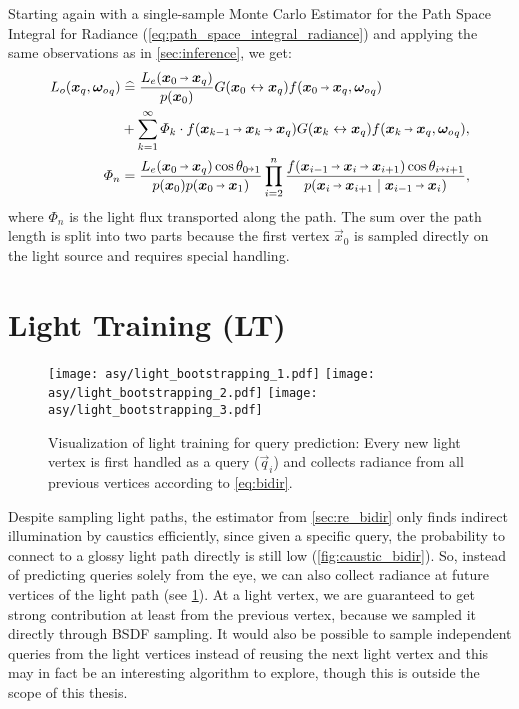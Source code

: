 Starting again with a single-sample Monte Carlo Estimator for the Path Space Integral for Radiance (\cref{eq:path_space_integral_radiance}) and applying the same observations as in \cref{sec:inference}, we get:
\begin{equation}
\label{eq:bidir}
\begin{aligned}
    L_o(\vec{x}_q, \wo_q)
    &\hateq \frac{L_e(\pdir{0}{q})}{p(\x_0)} \G{0}{q} f(\pdir{0}{q}, \wo_q) \\
    &+ \sum_{k=1}^{\infty} \Phi_k \cdot \f{k-1}{k}{q} \G{k}{q} f(\pdir{k}{q}, \wo_q), \\
    \Phi_n &= \frac{L_e(\pdir{0}{q}) \cos \theta_{0 \veryshortarrow 1}}{p(\x_0) p(\pdir{0}{1})} \prod_{i=2}^{n} \frac{f(\ptrip{i-1}{i}{i+1}) \cos \theta_{i \veryshortarrow i+1}}{p(\pdir{i}{i+1} \mid \pdir{i-1}{i})},
\end{aligned}
\end{equation}
where $\Phi_n$ is the light flux transported along the path.
The sum over the path length is split into two parts because the first vertex $\vec{x}_0$ is sampled directly on the light source and requires special handling.

\section{Light Training (LT)}
\label{sec:lt}
\begin{figure}[htb!]
    \centering
    \texttt{[image: asy/light\_bootstrapping\_1.pdf]}
    \texttt{[image: asy/light\_bootstrapping\_2.pdf]}
    \texttt{[image: asy/light\_bootstrapping\_3.pdf]}
    \caption{Visualization of light training for query prediction: Every new light vertex is first handled as a query ($\vec{q}_i$) and collects radiance from all previous vertices according to \cref{eq:bidir}.}
    \label{fig:light_bootstrap}
\end{figure}
Despite sampling light paths, the estimator from \cref{sec:re_bidir} only finds indirect illumination by caustics efficiently, since given a specific query, the probability to connect to a glossy light path directly is still low (\cref{fig:caustic_bidir}).
So, instead of predicting queries solely from the eye, we can also collect radiance at future vertices of the light path (see \cref{fig:light_bootstrap}).
At a light vertex, we are guaranteed to get strong contribution at least from the previous vertex, because we sampled it directly through BSDF sampling.
It would also be possible to sample independent queries from the light vertices instead of reusing the next light vertex and this may in fact be an interesting algorithm to explore, though this is outside the scope of this thesis.

